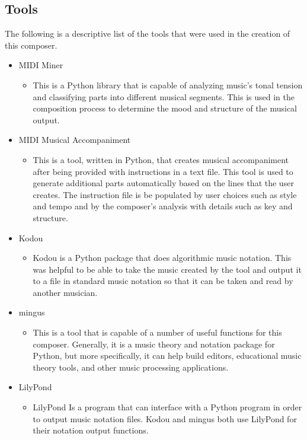\subsection{Tools}
\label{subsec:tools}

The following is a descriptive list of the tools that were used in the creation of this composer.

\begin{itemize}
	\item MIDI Miner
	\begin{itemize}
		\item This is a Python library that is capable of analyzing music's tonal tension and classifying parts into different musical segments.  This is used in the composition process to determine the mood and structure of the musical output.
	\end{itemize}
	\item MIDI Musical Accompaniment
	\begin{itemize}
		\item This is a tool, written in Python, that creates musical accompaniment after being provided with instructions in a text file.  This tool is used to generate additional parts automatically based on the lines that the user creates.  The instruction file is be populated by user choices such as style and tempo and by the composer's analysis with details such as key and structure.
	\end{itemize}
	\item Kodou
	\begin{itemize}
		\item Kodou is a Python package that does algorithmic music notation.  This was helpful to be able to take the music created by the tool and output it to a file in standard music notation so that it can be taken and read by another musician.
	\end{itemize}
	\item mingus
	\begin{itemize}
		\item This is a tool that is capable of a number of useful functions for this composer.  Generally, it is a music theory and notation package for Python, but more specifically, it can help build editors, educational music theory tools, and other music processing applications.
	\end{itemize}
	\item LilyPond
	\begin{itemize}
		\item LilyPond Is a program that can interface with a Python program in order to output music notation files.  Kodou and mingus both use LilyPond for their notation output functions.

\end{itemize}
\end{itemize}
